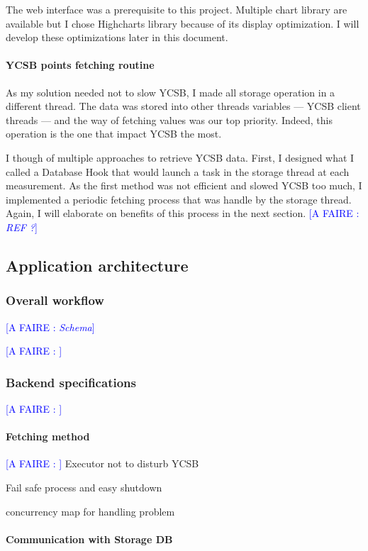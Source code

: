 \documentclass[a4paper,11pt]{article}
\newcommand*{\todo}[1]{\textcolor{blue}{[A FAIRE : \emph{#1}]}}
\begin{document}
The web interface was a prerequisite to this project. Multiple chart library are available but I chose Highcharts library because of its display optimization. I will develop these optimizations later in this document.

\paragraph{YCSB points fetching routine}

As my solution needed not to slow YCSB, I made all storage operation in a different thread. The data was stored into other threads variables --- YCSB client threads --- and the way of fetching values was our top priority. Indeed, this operation is the one that impact YCSB the most.

I though of multiple approaches to retrieve YCSB data. First, I designed what I called a Database Hook that would launch a task in the storage thread at each measurement. As the first method was not efficient and slowed YCSB too much, I implemented a periodic fetching process that was handle by the storage thread. Again, I will elaborate on benefits of this process in the next section. \todo{REF ?}

\subsection{Application architecture}

\subsubsection{Overall workflow}

\todo{Schema}

\todo{}
\subsubsection{Backend specifications}

\todo{}
\paragraph{Fetching method}

\todo{}
Executor not to disturb YCSB

Fail safe process and easy shutdown

concurrency map for handling problem

\paragraph{Communication with Storage DB}
\end{document}
